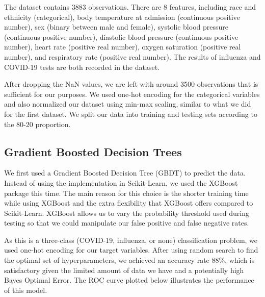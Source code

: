\documentclass[a4paper, 11pt]{article}
\begin{document}
The dataset contains 3883 observations. There are 8 features, including race and ethnicity (categorical), body temperature at admission (continuous positive number), sex (binary between male and female), systolic blood pressure (continuous positive number), diastolic blood pressure (continuous positive number), heart rate (positive real number), oxygen saturation (positive real number), and respiratory rate (positive real number). The results of influenza and COVID-19 tests are both recorded in the dataset. \par
After dropping the NaN values, we are left with around 3500 observations that is sufficient for our purposes. We used one-hot encoding for the categorical variables and also normalized our dataset using min-max scaling, similar to what we did for the first dataset. We split our data into training and testing sets according to the 80-20 proportion.\par


\subsection*{Gradient Boosted Decision Trees}

We first used a Gradient Boosted Decision Tree (GBDT) to predict the data. Instead of using the implementation in Scikit-Learn, we used the XGBoost package this time. The main reason for this choice is the shorter training time while using XGBoost and the extra flexibility that XGBoost offers compared to Scikit-Learn. XGBoost allows us to vary the probability threshold used during testing so that we could manipulate our false positive and false negative rates. \par 
As this is a three-class (COVID-19, influenza, or none) classification problem, we used one-hot encoding for our target variables. After using random search to find the optimal set of hyperparameters, we achieved an accuracy rate 88\%, which is satisfactory given the limited amount of data we have and a potentially high Bayes Optimal Error. The ROC curve plotted below illustrates the performance of this model.
\end{document}
